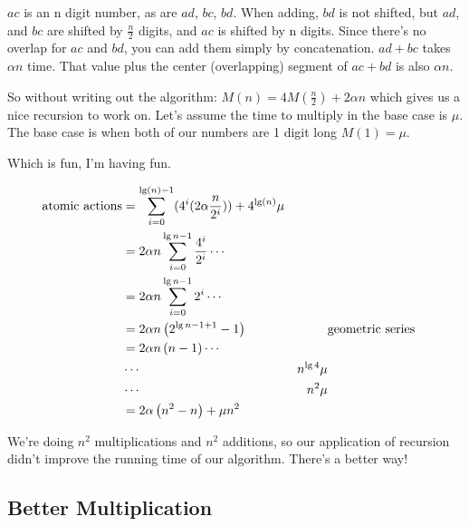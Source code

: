 \documentclass[english, 10pt]{article}
\begin{document}
$ac$ is an n digit number, as are $ad$, $bc$, $bd$. When adding, $bd$ is not shifted, but $ad$, and $bc$ are shifted by $\frac{n}{2}$ digits, and $ac$ is shifted by n digits.
Since there's no overlap for $ac$ and $bd$, you can add them simply by concatenation.
$ad + bc$ takes $\alpha n$ time. That value plus the center (overlapping) segment of $ac+bd$ is also $\alpha n$.


So without writing out the algorithm: $M(n) = 4M\left( \frac{n}{2} \right)+2\alpha n$ which gives us a nice recursion to work on. Let's assume the time to multiply in the base case is $\mu$. The base case is when both of our numbers are 1 digit long $M(1) = \mu$.


Which is fun, I'm having fun.

\begin{align*}
    \text{atomic actions} &= \sum_{i=0}^{\lg(n)-1} (4^i (2\alpha\frac{n}{2^i}) ) + 4^{\lg(n)}\mu \\
    &=2\alpha n \sum_{i=0}^{\lg n-1}\frac{4^i}{2^i} \cdots\\
    &=2\alpha n \sum_{i=0}^{\lg n-1}{2^i} \cdots\\
    &=2\alpha n \left( 2^{\lg n -1 +1} -1 \right) & & \text{geometric series} \\
    &=2\alpha n \left( n-1 \right) \cdots\\
    &\cdots & n^{\lg 4} \mu \\
    &\cdots & n^2 \mu \\
    &= 2\alpha \left( n^2 -n \right)+\mu n^2
\end{align*}

We're doing $n^2$ multiplications and $n^2$ additions, so our application of
recursion didn't improve the running time of our algorithm. There's a better
way!

\subsection{Better Multiplication}
\end{document}
